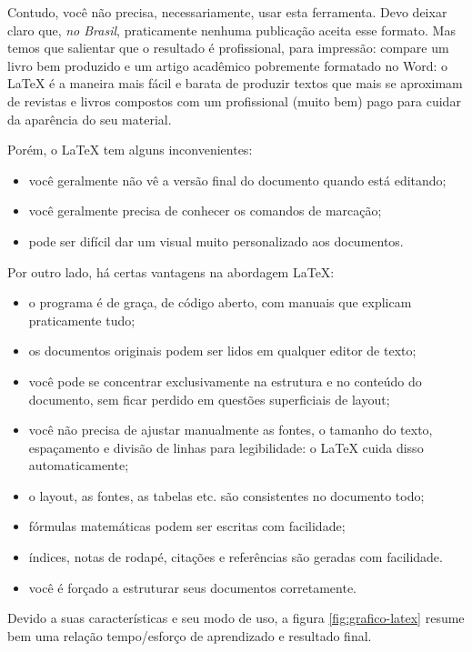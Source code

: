 \documentclass[a4paper,numbers=noenddot,abstract,DIV=calc]{scrbook} %
\begin{document}
Contudo, você não precisa, necessariamente, usar esta ferramenta. Devo deixar claro que, \textit{no Brasil}, praticamente nenhuma publicação aceita esse formato. Mas temos que salientar que o resultado é profissional, para impressão: compare um livro bem produzido e um artigo acadêmico pobremente formatado no Word: o \LaTeX{} é a maneira mais fácil e barata de produzir textos que mais se aproximam de revistas e livros compostos com um profissional (muito bem) pago para cuidar da aparência do seu material. 

Porém, o \LaTeX{} tem alguns inconvenientes:
 
\begin{itemize}

\item você geralmente não vê a versão final do documento quando está editando;
\item você geralmente precisa de conhecer os comandos de marcação;
\item pode ser difícil dar um visual muito personalizado aos documentos.
\end{itemize}

Por outro lado, há certas vantagens na abordagem \LaTeX:
\begin{itemize}
\item o programa é de graça, de código aberto, com manuais que explicam praticamente tudo;
\item os documentos originais podem ser lidos em qualquer editor de texto;
\item você pode se concentrar exclusivamente na estrutura e no conteúdo do documento, sem ficar perdido em questões superficiais de layout;
\item você não precisa de ajustar manualmente as fontes, o tamanho do texto, espaçamento e divisão de linhas para legibilidade: o \LaTeX{} cuida disso automaticamente;
\item o layout, as fontes, as tabelas etc. são consistentes no documento todo;
\item fórmulas matemáticas podem ser escritas com facilidade;
\item índices, notas de rodapé, citações e referências são geradas com facilidade.
\item você é forçado a estruturar seus documentos corretamente.
\end{itemize}

Devido a suas características e seu modo de uso, a figura \ref{fig:grafico-latex} resume bem uma relação tempo/esforço de aprendizado e resultado final.
\end{document}
